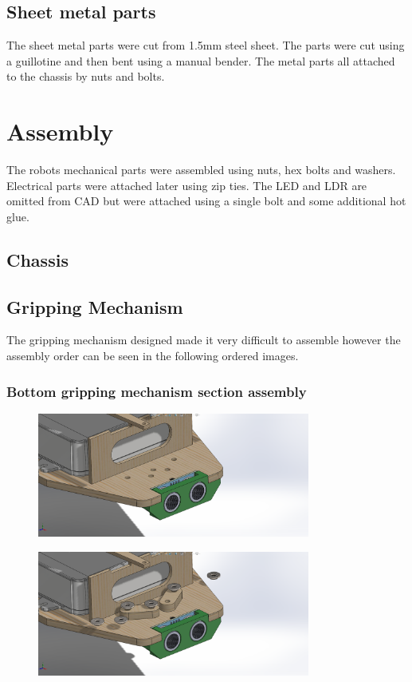 \documentclass{article}
\begin{document}
\subsection{Sheet metal parts}
\quad The sheet metal parts were cut from 1.5mm steel sheet. The parts were cut using a guillotine and then bent using a manual bender. The metal parts all attached to the chassis by nuts and bolts.

\section{Assembly}
\quad The robots mechanical parts were assembled using nuts, hex bolts and washers. Electrical parts were attached later using zip ties. The LED and LDR are omitted from CAD but were attached using a single bolt and some additional hot glue.

\subsection {Chassis}

\subsection{Gripping Mechanism}
\quad The gripping mechanism designed made it very difficult to assemble however the assembly order can be seen in the following ordered images.

\subsubsection{Bottom gripping mechanism section assembly} 

\begin{figure}[H]
    \centering
    \includegraphics[width=0.8\textwidth]{assets/assembly/1.png}
\end{figure}

\begin{figure}[H]
    \centering
    \includegraphics[width=0.8\textwidth]{assets/assembly/2.png}
\end{figure}
\end{document}
